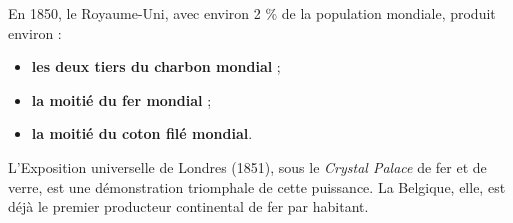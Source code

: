 \documentclass[11pt]{article}
\begin{document}
\begin{exemplebox}
En 1850, le Royaume-Uni, avec environ 2 \% de la population mondiale, produit environ :
\begin{itemize}
\item \textbf{les deux tiers du charbon mondial} ;
\item \textbf{la moitié du fer mondial} ;
\item \textbf{la moitié du coton filé mondial}.
\end{itemize}
L'Exposition universelle de Londres (1851), sous le \emph{Crystal Palace} de fer et de verre, est une démonstration triomphale de cette puissance. La Belgique, elle, est déjà le premier producteur continental de fer par habitant.
\end{exemplebox}
\end{document}
